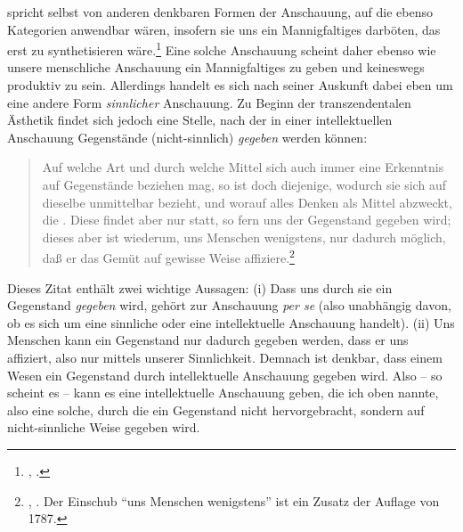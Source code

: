  spricht selbst von
anderen denkbaren Formen der Anschauung, auf die ebenso Kategorien anwendbar
wären, insofern sie uns ein Mannigfaltiges darböten, das erst zu synthetisieren
wäre.\footnote{\cite[Vgl.][\S~23]{Kant:KritikderreinenVernunft2003},
\cite[][III: 118.7--10]{Kant:GesammelteWerke1900ff.}.} Eine solche Anschauung
scheint daher ebenso wie unsere menschliche Anschauung ein Mannigfaltiges zu
geben und keineswegs produktiv zu sein. Allerdings handelt es sich nach seiner
Auskunft dabei eben um eine andere Form \emph{sinnlicher} Anschauung. Zu Beginn
der transzendentalen Ästhetik findet sich jedoch eine Stelle, nach der in einer
intellektuellen Anschauung Gegenstände (nicht-sinnlich) \emph{gegeben} werden
können:
\begin{quote}
Auf welche Art und durch welche Mittel sich auch immer eine Erkenntnis auf
Gegenstände beziehen mag, so ist doch diejenige, wodurch sie sich auf dieselbe
unmittelbar bezieht, und worauf alles Denken als Mittel abzweckt, die
. Diese findet aber nur statt, so fern uns der Gegenstand
gegeben wird; dieses aber ist wiederum, uns Menschen wenigstens, nur dadurch
möglich, daß er das Gemüt auf gewisse Weise
affiziere.\footnote{\cite[][B 33]{Kant:KritikderreinenVernunft2003},
\cite[][III: 49.6--11]{Kant:GesammelteWerke1900ff.}. Der Einschub \enquote{uns
Menschen wenigstens} ist ein Zusatz der Auflage von 1787.}
\end{quote}
Dieses Zitat enthält zwei wichtige Aussagen: (i) Dass uns durch sie ein
Gegenstand \emph{gegeben} wird, gehört zur Anschauung \emph{per se} (also unabhängig
davon, ob es sich um eine sinnliche oder eine intellektuelle Anschauung
handelt). (ii)  Uns Menschen kann ein Gegenstand nur dadurch gegeben werden,
dass er uns affiziert, also nur mittels unserer Sinnlichkeit. Demnach ist denkbar, dass
einem Wesen ein Gegenstand durch intellektuelle Anschauung gegeben wird. Also --
so scheint es -- kann es eine intellektuelle Anschauung geben, die ich oben
 nannte, also eine solche, durch die ein Gegenstand
nicht hervorgebracht, sondern auf nicht-sinnliche Weise gegeben wird.


